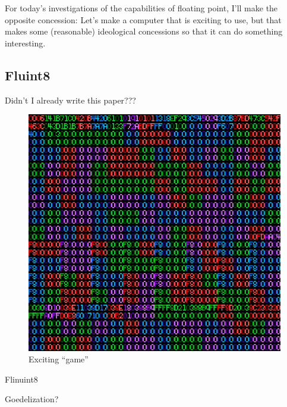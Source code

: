 \documentclass[twocolumn]{article}
\begin{document}
For today's investigations of the capabilities of floating point, I'll
make the opposite concession: Let's make a computer that is exciting
to use, but that makes some (reasonable) ideological concessions so that
it can do something interesting.

\subsection{Fluint8}

Didn't I already write this paper???

\begin{figure}[htp]
  \includegraphics[width=0.9 \linewidth]{testrom}
  \caption{
    Exciting ``game''
  } \label{fig:testrom}
\end{figure}

Flinuint8

Goedelization?
\end{document}
